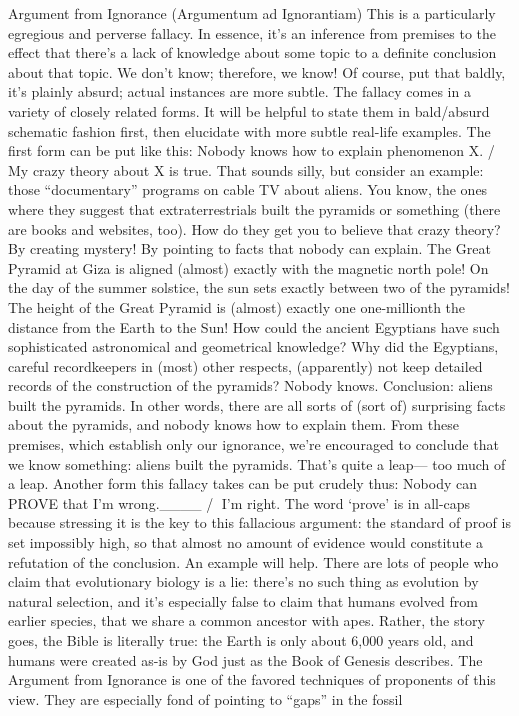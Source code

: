 Argument from Ignorance (Argumentum ad Ignorantiam)
This is a particularly egregious and perverse fallacy. In essence, it’s an inference from premises to
the effect that there’s a lack of knowledge about some topic to a definite conclusion about that
topic. We don’t know; therefore, we know!
Of course, put that baldly, it’s plainly absurd; actual instances are more subtle. The fallacy comes
in a variety of closely related forms. It will be helpful to state them in bald/absurd schematic
fashion first, then elucidate with more subtle real-life examples.
The first form can be put like this:
Nobody knows how to explain phenomenon X.
/ My crazy theory about X is true.
That sounds silly, but consider an example: those “documentary” programs on cable TV about
aliens. You know, the ones where they suggest that extraterrestrials built the pyramids or
something (there are books and websites, too). How do they get you to believe that crazy theory?
By creating mystery! By pointing to facts that nobody can explain. The Great Pyramid at Giza is
aligned (almost) exactly with the magnetic north pole! On the day of the summer solstice, the sun
sets exactly between two of the pyramids! The height of the Great Pyramid is (almost) exactly one
one-millionth the distance from the Earth to the Sun! How could the ancient Egyptians have such
sophisticated astronomical and geometrical knowledge? Why did the Egyptians, careful recordkeepers in (most) other respects, (apparently) not keep detailed records of the construction of the
pyramids? Nobody knows. Conclusion: aliens built the pyramids.
In other words, there are all sorts of (sort of) surprising facts about the pyramids, and nobody
knows how to explain them. From these premises, which establish only our ignorance, we’re
encouraged to conclude that we know something: aliens built the pyramids. That’s quite a leap—
too much of a leap.
Another form this fallacy takes can be put crudely thus:
Nobody can PROVE that I’m wrong.____
/ I’m right.
The word ‘prove’ is in all-caps because stressing it is the key to this fallacious argument: the
standard of proof is set impossibly high, so that almost no amount of evidence would constitute a
refutation of the conclusion.
An example will help. There are lots of people who claim that evolutionary biology is a lie: there’s
no such thing as evolution by natural selection, and it’s especially false to claim that humans
evolved from earlier species, that we share a common ancestor with apes. Rather, the story goes,
the Bible is literally true: the Earth is only about 6,000 years old, and humans were created as-is
by God just as the Book of Genesis describes. The Argument from Ignorance is one of the favored
techniques of proponents of this view. They are especially fond of pointing to “gaps” in the fossil

